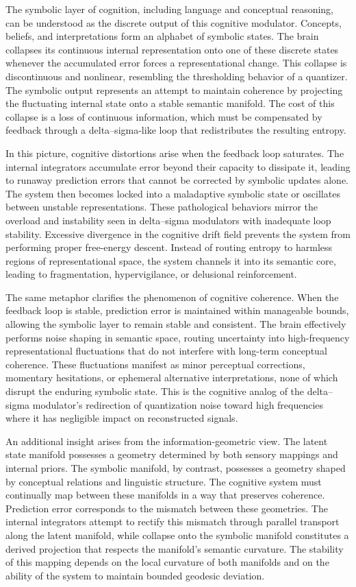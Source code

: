 The symbolic layer of cognition, including language and conceptual reasoning, can be understood as the discrete output of this cognitive modulator. Concepts, beliefs, and interpretations form an alphabet of symbolic states. The brain collapses its continuous internal representation onto one of these discrete states whenever the accumulated error forces a representational change. This collapse is discontinuous and nonlinear, resembling the thresholding behavior of a quantizer. The symbolic output represents an attempt to maintain coherence by projecting the fluctuating internal state onto a stable semantic manifold. The cost of this collapse is a loss of continuous information, which must be compensated by feedback through a delta–sigma-like loop that redistributes the resulting entropy.

In this picture, cognitive distortions arise when the feedback loop saturates. The internal integrators accumulate error beyond their capacity to dissipate it, leading to runaway prediction errors that cannot be corrected by symbolic updates alone. The system then becomes locked into a maladaptive symbolic state or oscillates between unstable representations. These pathological behaviors mirror the overload and instability seen in delta–sigma modulators with inadequate loop stability. Excessive divergence in the cognitive drift field prevents the system from performing proper free-energy descent. Instead of routing entropy to harmless regions of representational space, the system channels it into its semantic core, leading to fragmentation, hypervigilance, or delusional reinforcement.

The same metaphor clarifies the phenomenon of cognitive coherence. When the feedback loop is stable, prediction error is maintained within manageable bounds, allowing the symbolic layer to remain stable and consistent. The brain effectively performs noise shaping in semantic space, routing uncertainty into high-frequency representational fluctuations that do not interfere with long-term conceptual coherence. These fluctuations manifest as minor perceptual corrections, momentary hesitations, or ephemeral alternative interpretations, none of which disrupt the enduring symbolic state. This is the cognitive analog of the delta–sigma modulator’s redirection of quantization noise toward high frequencies where it has negligible impact on reconstructed signals.

An additional insight arises from the information-geometric view. The latent state manifold possesses a geometry determined by both sensory mappings and internal priors. The symbolic manifold, by contrast, possesses a geometry shaped by conceptual relations and linguistic structure. The cognitive system must continually map between these manifolds in a way that preserves coherence. Prediction error corresponds to the mismatch between these geometries. The internal integrators attempt to rectify this mismatch through parallel transport along the latent manifold, while collapse onto the symbolic manifold constitutes a derived projection that respects the manifold’s semantic curvature. The stability of this mapping depends on the local curvature of both manifolds and on the ability of the system to maintain bounded geodesic deviation.

